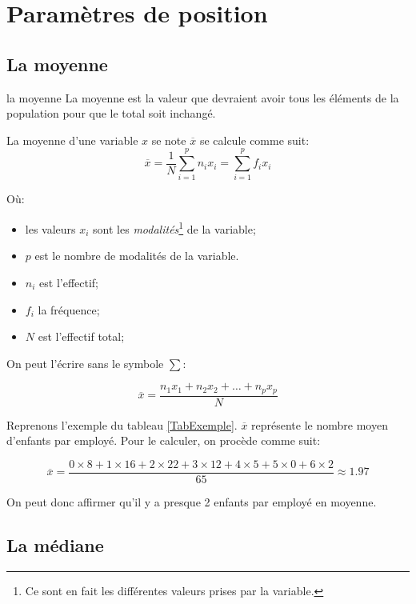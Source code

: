 \documentclass[a4paper,12pt]{scrartcl}
\begin{document}
\section{Paramètres de position}

\subsection{La moyenne}

\begin{definition}{la moyenne} 
La moyenne est la valeur que devraient avoir tous les éléments de la population pour que le total soit inchangé.
\end{definition}

La moyenne d'une variable $x$ se note $\overline{x}$ se calcule comme suit:
\begin{equation}
\overline{x} = \frac{1}{N} \sum_{i=1}^p n_i x_i = \sum_{i=1}^p f_i x_i
\end{equation}

Où:

\begin{itemize}
\item les valeurs $x_i$ sont les \emph{modalités}\footnote{Ce sont en fait les différentes valeurs prises par la variable.} de la variable;
\item $p$ est le nombre de modalités de la variable.
\item $n_i$ est l'effectif;
\item $f_i$ la fréquence;
\item $N$ est l'effectif total;
\end{itemize}

On peut l'écrire sans le symbole $\sum$:

$$\overline{x} = \frac{n_1 x_1 + n_2 x_2 + \ldots + n_p x_p}{N}$$

\exemple{}

Reprenons l'exemple du tableau \ref{TabExemple}. $\overline{x}$ représente le nombre moyen d'enfants par employé. Pour le calculer, on procède comme suit:

$$\overline{x} = \dfrac{0 \times 8 + 1 \times 16 + 2 \times 22 + 3 \times 12 + 4 \times 5 + 5 \times 0 + 6 \times 2 }{65} \approx 1.97$$

On peut donc affirmer qu'il y a presque 2 enfants par employé en moyenne.


\subsection{La médiane} \label{mediane}
\end{document}
